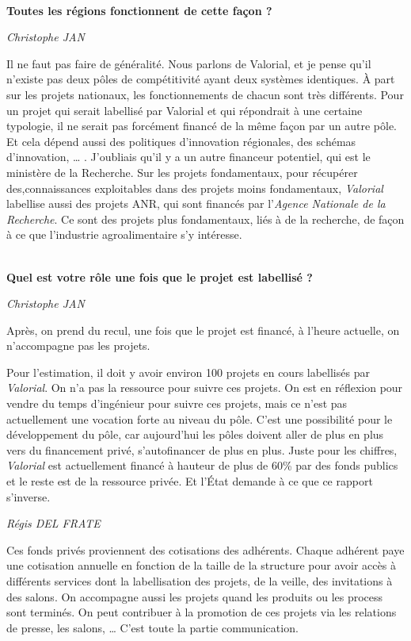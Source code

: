 \documentclass[a4paper,12pt]{report}
\begin{document}
	\textbf{\\Toutes les régions fonctionnent de cette façon  ?}

	\emph{Christophe JAN }

    Il ne faut pas faire de généralité. Nous parlons de Valorial, et je pense qu’il n’existe pas deux pôles de compétitivité ayant deux systèmes identiques. À part sur les projets nationaux, les fonctionnements de chacun sont très différents. Pour un projet qui serait labellisé par Valorial et qui répondrait à une certaine typologie, il ne serait pas forcément financé de la même façon par un autre pôle. Et cela dépend aussi des politiques d’innovation régionales, des schémas d’innovation, … . J’oubliais qu’il y a un autre financeur potentiel, qui est le ministère de la Recherche. Sur les projets fondamentaux, pour récupérer des,connaissances exploitables dans des projets moins fondamentaux, \textit{Valorial} labellise aussi des projets ANR, qui sont financés par l’\textit{Agence Nationale de la Recherche}. Ce sont des projets plus fondamentaux, liés à de la recherche, de façon à ce que l’industrie agroalimentaire s’y intéresse.

	\textbf{\\Quel est votre rôle une fois que le projet est labellisé ?}

	\emph{Christophe JAN}
	
	Après, on prend du recul, une fois que le projet est financé, à l’heure actuelle, on n’accompagne pas les projets.

	Pour l’estimation, il doit y avoir environ 100 projets en cours labellisés par \textit{Valorial}. On n’a pas la ressource pour suivre ces projets. On est en réflexion pour vendre du temps d’ingénieur pour suivre ces projets, mais ce n’est pas actuellement une vocation forte au niveau du pôle. C’est une possibilité pour le développement du pôle, car aujourd’hui les pôles doivent aller de plus en plus vers du financement privé, s’autofinancer de plus en plus. Juste pour les chiffres, \textit{Valorial} est actuellement financé à hauteur de plus de 60\% par des fonds publics et le reste est de la ressource privée. Et l’État demande à ce que ce rapport s’inverse.

	\emph{Régis DEL FRATE}

    Ces fonds privés proviennent des cotisations des adhérents. Chaque adhérent paye une cotisation annuelle en fonction de la taille de la structure pour avoir accès à différents services dont la labellisation des projets, de la veille, des invitations à des salons. On accompagne aussi les projets quand les produits ou les process sont terminés. On peut contribuer à la promotion de ces projets via les relations de presse, les salons, … C’est toute la partie communication.
\end{document}
